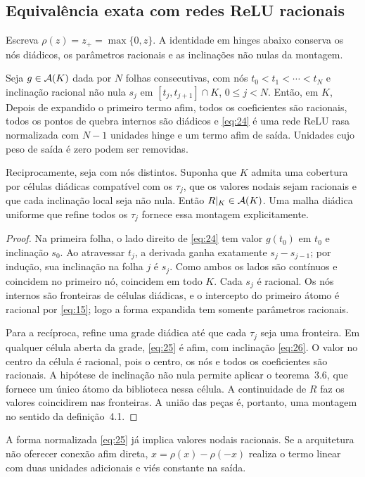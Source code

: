 \subsection{Equivalência exata com redes ReLU racionais}
Escreva $\rho(z)=z_+=\max\{0,z\}$. A identidade em hinges abaixo conserva os nós diádicos, os parâmetros racionais e as inclinações não nulas da montagem.
\begin{teorema}
Seja $g\in\mathcal A(K)$ dada por $N$ folhas consecutivas, com nós $t_0<t_1<\cdots<t_N$ e inclinação racional não nula $s_j$ em $[t_j,t_{j+1}]\cap K$, $0\le j<N$. Então, em $K$,
Depois de expandido o primeiro termo afim, todos os coeficientes são racionais, todos os pontos de quebra internos são diádicos e \eqref{eq:24} é uma rede ReLU rasa normalizada com $N-1$ unidades hinge e um termo afim de saída. Unidades cujo peso de saída é zero podem ser removidas.

Reciprocamente, seja
com nós distintos. Suponha que $K$ admita uma cobertura por células diádicas compatível com os $\tau_j$, que os valores nodais sejam racionais e que cada inclinação local
seja não nula. Então $R|_K\in\mathcal A(K)$. Uma malha diádica uniforme que refine todos os $\tau_j$ fornece essa montagem explicitamente.
\end{teorema}
\begin{proof}
Na primeira folha, o lado direito de \eqref{eq:24} tem valor $g(t_0)$ em $t_0$ e inclinação $s_0$. Ao atravessar $t_j$, a derivada ganha exatamente $s_j-s_{j-1}$; por indução, sua inclinação na folha $j$ é $s_j$. Como ambos os lados são contínuos e coincidem no primeiro nó, coincidem em todo $K$. Cada $s_j$ é racional. Os nós internos são fronteiras de células diádicas, e o intercepto do primeiro átomo é racional por \eqref{eq:15}; logo a forma expandida tem somente parâmetros racionais.

Para a recíproca, refine uma grade diádica até que cada $\tau_j$ seja uma fronteira. Em qualquer célula aberta da grade, \eqref{eq:25} é afim, com inclinação \eqref{eq:26}. O valor no centro da célula é racional, pois o centro, os nós e todos os coeficientes são racionais. A hipótese de inclinação não nula permite aplicar o teorema~3.6, que fornece um único átomo da biblioteca nessa célula. A continuidade de $R$ faz os valores coincidirem nas fronteiras. A união das peças é, portanto, uma montagem no sentido da definição~4.1.
\end{proof}
A forma normalizada \eqref{eq:25} já implica valores nodais racionais. Se a arquitetura não oferecer conexão afim direta, $x=\rho(x)-\rho(-x)$ realiza o termo linear com duas unidades adicionais e viés constante na saída.

